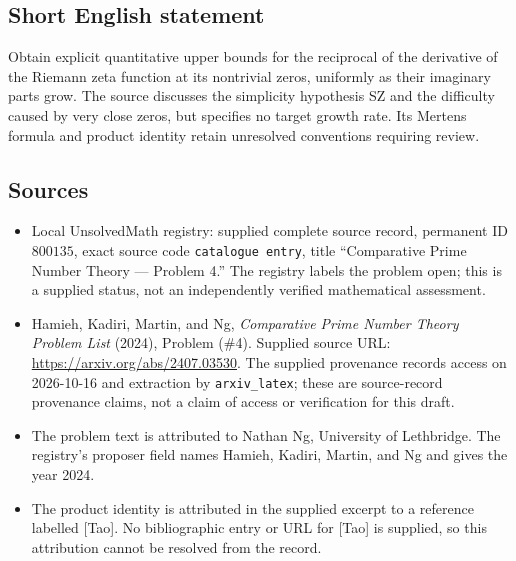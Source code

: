 \documentclass[11pt]{article}
\begin{document}
\subsection{Short English statement}
Obtain explicit quantitative upper bounds for the reciprocal of the derivative of the Riemann zeta function at its nontrivial zeros, uniformly as their imaginary parts grow. The source discusses the simplicity hypothesis SZ and the difficulty caused by very close zeros, but specifies no target growth rate. Its Mertens formula and product identity retain unresolved conventions requiring review.
\subsection{Sources}
\begin{itemize}
\item Local UnsolvedMath registry: supplied complete source record, permanent ID \(800135\), exact source code \texttt{catalogue entry}, title ``Comparative Prime Number Theory --- Problem 4.'' The registry labels the problem open; this is a supplied status, not an independently verified mathematical assessment.
\item Hamieh, Kadiri, Martin, and Ng, \emph{Comparative Prime Number Theory Problem List} (2024), Problem (\#4). Supplied source URL: \url{https://arxiv.org/abs/2407.03530}. The supplied provenance records access on 2026-10-16 and extraction by \texttt{arxiv\_latex}; these are source-record provenance claims, not a claim of access or verification for this draft.
\item The problem text is attributed to Nathan Ng, University of Lethbridge. The registry's proposer field names Hamieh, Kadiri, Martin, and Ng and gives the year 2024.
\item The product identity is attributed in the supplied excerpt to a reference labelled [Tao]. No bibliographic entry or URL for [Tao] is supplied, so this attribution cannot be resolved from the record.
\end{itemize}
\end{document}
